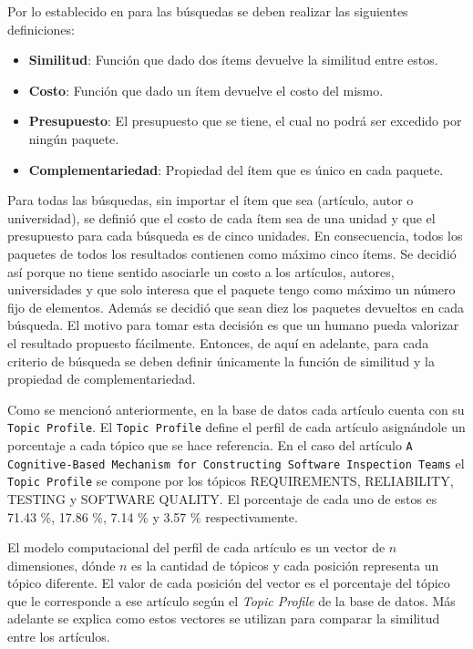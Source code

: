 Por lo establecido en \cite{compositeRetrival} para las búsquedas se deben realizar las siguientes definiciones:
\begin{itemize}
  \item \textbf{Similitud}: Función que dado dos ítems devuelve la similitud entre estos.
  \item \textbf{Costo}: Función que dado un ítem devuelve el costo del mismo.
  \item \textbf{Presupuesto}: El presupuesto que se tiene, el cual no podrá ser excedido por ningún paquete.
  \item \textbf{Complementariedad}: Propiedad del ítem que es único en cada paquete.
\end{itemize}

Para todas las búsquedas, sin importar el ítem que sea (artículo, autor o universidad), se definió que el costo de cada ítem sea de una unidad y que el presupuesto para cada búsqueda es de cinco unidades. En consecuencia, todos los paquetes de todos los resultados contienen como máximo cinco ítems. Se decidió así porque no tiene sentido asociarle un costo a los artículos, autores, universidades y que solo interesa que el paquete tengo como máximo un número fijo de elementos. Además se decidió que sean diez los paquetes devueltos en cada búsqueda. El motivo para tomar esta decisión es que un humano pueda valorizar el resultado propuesto fácilmente. Entonces, de aquí en adelante, para cada criterio de búsqueda se deben definir únicamente la función de similitud y la propiedad de complementariedad.

Como se mencionó anteriormente, en la base de datos cada artículo cuenta con su \texttt{Topic Profile}. El \texttt{Topic Profile} define el perfil de cada artículo asignándole un porcentaje a cada tópico que se hace referencia. En el caso del artículo \texttt{A Cognitive-Based Mechanism for Constructing Software Inspection Teams} el \texttt{Topic Profile} se compone por los tópicos  REQUIREMENTS, RELIABILITY, TESTING y SOFTWARE QUALITY. El porcentaje de cada uno de estos es 71.43 \%, 17.86 \%, 7.14 \% y 3.57 \% respectivamente.

El modelo computacional del perfil de cada artículo es un vector de $n$ dimensiones, dónde $n$ es la cantidad de tópicos y cada posición representa un tópico diferente. El valor de cada posición del vector es el porcentaje del tópico que le corresponde a ese artículo según el \textit{Topic Profile} de la base de datos. Más adelante se explica como estos vectores se utilizan para comparar la similitud entre los artículos.


